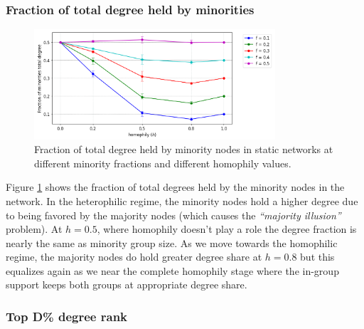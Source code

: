 \subsubsection{Fraction of total degree held by minorities}

\begin{figure}[h!]
	\centering
	\includegraphics[width=0.8\textwidth]{images/mf_static.png}
	\caption{Fraction of total degree held by minority nodes in static networks at different minority fractions and different homophily values.}
	\label{mf_static_fig}
\end{figure}

Figure \ref{mf_static_fig} shows the fraction of total degrees held by the minority nodes in the network. In the heterophilic regime, the minority nodes hold a higher degree due to being favored by the majority nodes (which causes the \textit{``majority illusion''} problem). At $h=0.5$, where homophily doesn't play a role the degree fraction is nearly the same as minority group size. As we move towards the homophilic regime, the majority nodes do hold greater degree share at $h=0.8$ but this equalizes again as we near the complete homophily stage where the in-group support keeps both groups at appropriate degree share. 

\subsubsection{Top D\% degree rank}

